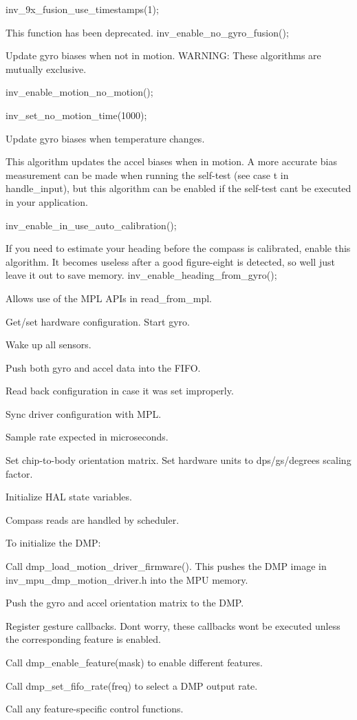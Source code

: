 inv\+\_\+9x\+\_\+fusion\+\_\+use\+\_\+timestamps(1);

This function has been deprecated. inv\+\_\+enable\+\_\+no\+\_\+gyro\+\_\+fusion();

Update gyro biases when not in motion. W\+A\+R\+N\+I\+NG\+: These algorithms are mutually exclusive.

inv\+\_\+enable\+\_\+motion\+\_\+no\+\_\+motion();

inv\+\_\+set\+\_\+no\+\_\+motion\+\_\+time(1000);

Update gyro biases when temperature changes.

This algorithm updates the accel biases when in motion. A more accurate bias measurement can be made when running the self-\/test (see case \textquotesingle{}t\textquotesingle{} in handle\+\_\+input), but this algorithm can be enabled if the self-\/test can\textquotesingle{}t be executed in your application.

inv\+\_\+enable\+\_\+in\+\_\+use\+\_\+auto\+\_\+calibration();

If you need to estimate your heading before the compass is calibrated, enable this algorithm. It becomes useless after a good figure-\/eight is detected, so we\textquotesingle{}ll just leave it out to save memory. inv\+\_\+enable\+\_\+heading\+\_\+from\+\_\+gyro();

Allows use of the M\+PL A\+P\+Is in read\+\_\+from\+\_\+mpl.

Get/set hardware configuration. Start gyro.

Wake up all sensors.

Push both gyro and accel data into the F\+I\+FO.

Read back configuration in case it was set improperly.

Sync driver configuration with M\+PL.

Sample rate expected in microseconds.

Set chip-\/to-\/body orientation matrix. Set hardware units to dps/g\textquotesingle{}s/degrees scaling factor.

Initialize H\+AL state variables.

Compass reads are handled by scheduler.

To initialize the D\+MP\+:
\begin{DoxyEnumerate}
\item Call dmp\+\_\+load\+\_\+motion\+\_\+driver\+\_\+firmware(). This pushes the D\+MP image in inv\+\_\+mpu\+\_\+dmp\+\_\+motion\+\_\+driver.\+h into the M\+PU memory.
\item Push the gyro and accel orientation matrix to the D\+MP.
\item Register gesture callbacks. Don\textquotesingle{}t worry, these callbacks won\textquotesingle{}t be executed unless the corresponding feature is enabled.
\item Call dmp\+\_\+enable\+\_\+feature(mask) to enable different features.
\item Call dmp\+\_\+set\+\_\+fifo\+\_\+rate(freq) to select a D\+MP output rate.
\item Call any feature-\/specific control functions.
\end{DoxyEnumerate}

